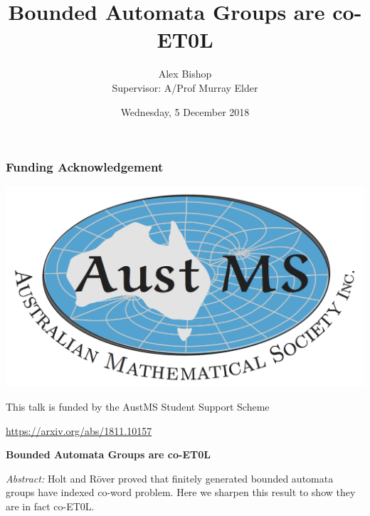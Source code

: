 \documentclass[11pt]{beamer}
\begin{document}
\author[Alex Bishop]{Alex Bishop\\\vspace{.6em}Supervisor: A/Prof Murray Elder}
\title{Bounded Automata Groups are co-ET0L}
\date{Wednesday, 5 December 2018}%
\begin{frame}[plain]
	\maketitle
\end{frame}


\begin{frame}
\frametitle{Funding Acknowledgement}
\begin{center}
	\includegraphics[width=0.8\linewidth]{figure/austms}
	
	\vspace{2em}
	
	\large
	This talk is funded by the AustMS Student Support Scheme
\end{center}
\end{frame}


\begin{frame}
\begin{center}
\LARGE	
\url{https://arxiv.org/abs/1811.10157}

\pause
\vspace{1.5cm}
	
	\textbf{\Large Bounded Automata Groups are co-ET0L}
	
\end{center}
	{
		\textit{Abstract:}
		Holt and R\"over proved that finitely generated bounded automata groups have indexed co-word problem. Here we sharpen this result to show they are in fact co-ET0L.
	}
	
	
%		
%		
%		
%		
\end{frame}
\end{document}
